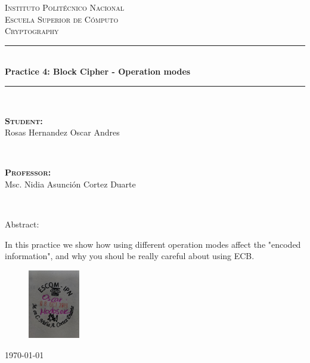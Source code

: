 \documentclass[fleqn, journal, onecolumn]{IEEEtran}             %
\author{Oscar Andrés Rosas}                                     %
\theoremstyle{break}                                            %
\begin{document}
  \begin{titlepage}

    \center
    \textsc{\Large Instituto Politécnico Nacional \\ Escuela Superior de Cómputo}\\[0.5cm] 
    \textsc{\large Cryptography}\\[1.5cm]

    \rule{\linewidth}{0.5mm} \\[1.0cm]
        { \huge \bfseries Practice 4: Block Cipher - Operation modes}\\[1.0cm] 
    \rule{\linewidth}{0.5mm} \\[2.0cm]
    
    \begin{minipage}{0.4\textwidth}
        \begin{flushleft} \large
            \textbf{\textsc{Student:}}\\
            Rosas Hernandez Oscar Andres
        \end{flushleft}
    \end{minipage}
    ~
    \begin{minipage}{0.4\textwidth}
        \begin{flushright} \large
            \textbf{\textsc{Professor: }}\\
            Msc. Nidia Asunción Cortez Duarte
        \end{flushright}
    \end{minipage}\\[3,5cm]

    {\large
      Abstract:
      
      In this practice we show how using different operation modes affect the "encoded information", and why you shoul be really careful
      about using ECB.
      \\[2cm]
    }
    

    \begin{figure}[h]
      \centering
      \includegraphics[width=0.20\textwidth]{Sello}
    \end{figure}


    {\large \today}\\[2cm] 

    \vfill

  \end{titlepage}
\end{document}
